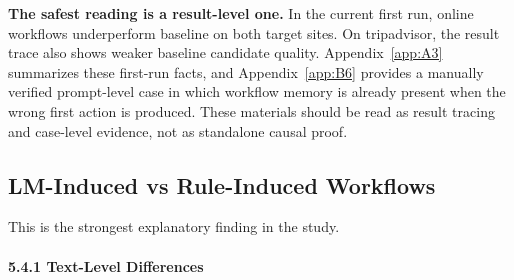 \documentclass{article}
\begin{document}
\textbf{The safest reading is a result-level one.} In the current
first run, online workflows underperform baseline on both target sites.
On tripadvisor, the result trace also shows weaker baseline candidate
quality. Appendix~\ref{app:A3} summarizes these first-run facts, and
Appendix~\ref{app:B6} provides a manually verified prompt-level case in
which workflow memory is already present when the wrong first action is
produced. These materials should be read as result tracing and
case-level evidence, not as standalone causal proof.

\subsection{LM-Induced vs Rule-Induced
Workflows}\label{c3-lm-induced-vs-rule-induced-workflows}

This is the strongest explanatory finding in the study.

\paragraph{5.4.1 Text-Level Differences}\label{text-level-differences}
\end{document}
